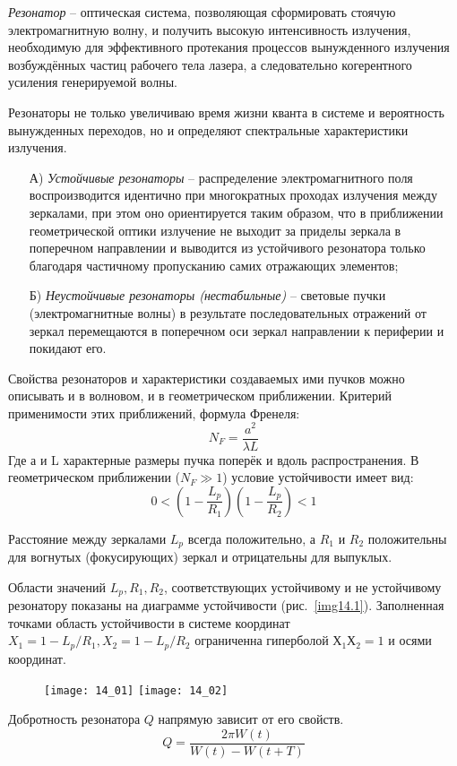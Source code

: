 
\emph{Резонатор} -- оптическая система, позволяющая сформировать стоячую
электромагнитную волну, и получить высокую интенсивность излучения,
необходимую для эффективного протекания процессов вынужденного излучения
возбуждённых частиц рабочего тела лазера, а следовательно когерентного
усиления генерируемой волны.

Резонаторы не только увеличиваю время жизни кванта в системе и вероятность
вынужденных переходов, но и определяют спектральные характеристики излучения.
\begin{enumerate}
    \item[А)] \emph{Устойчивые резонаторы} -- распределение электромагнитного поля
воспроизводится идентично при многократных проходах излучения между зеркалами,
при этом оно ориентируется таким образом, что в приближении геометрической
оптики излучение не выходит за приделы зеркала в поперечном направлении и
выводится из устойчивого резонатора только благодаря частичному пропусканию
самих отражающих элементов;
    \item[Б)] \emph{Неустойчивые резонаторы (нестабильные)} -- световые пучки
(электромагнитные волны) в результате последовательных отражений от зеркал
перемещаются в поперечном оси зеркал направлении к периферии и покидают его.
\end{enumerate}
Свойства резонаторов и характеристики создаваемых ими пучков можно описывать
и в волновом, и в геометрическом приближении. Критерий применимости этих
приближений, формула Френеля:
\[
    N_F = \frac{a^2}{\lambda L}
\]
Где а и L характерные размеры пучка поперёк и вдоль распространения.
В геометрическом приближении (\( N_F \gg 1 \)) условие устойчивости имеет вид:
\[
    0 < \left(1-\frac{L_p}{R_1}\right)\left(1-\frac{L_p}{R_2}\right) < 1
\]

Расстояние между зеркалами \( L_p \) всегда положительно, а \( R_1 \) и
\( R_2 \) положительны для вогнутых (фокусирующих) зеркал и отрицательны для
выпуклых.

Области значений \( L_p, R_1, R_2 \), соответствующих устойчивому и не
устойчивому резонатору показаны на диаграмме устойчивости
(рис.~\ref{img14.1}). Заполненная точками область устойчивости в системе
координат \( X_1 = 1-L_p/R_1, X_2 = 1-L_p/R_2 \) ограниченна гиперболой
\( Х_1 Х_2 = 1 \) и осями координат.
\begin{figure}[h]
    \center
    \texttt{[image: 14\_01]}
    \label{img14.1}\hfill
    \texttt{[image: 14\_02]}
    \label{img14.2}
\end{figure}

Добротность резонатора \( Q \) напрямую зависит от его свойств.
\[
    Q = \frac{2\pi W(t)}{W(t)-W(t+T)}
\]
